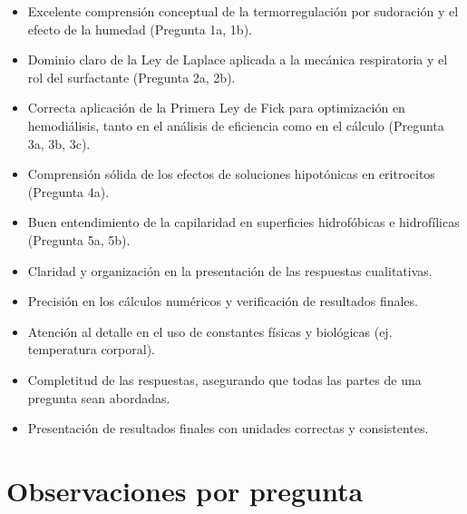 \documentclass[11pt,a4paper]{article}
\begin{document}
\vspace{4pt}
\begin{minipage}[t]{0.48\linewidth}
  \begin{tcolorbox}[cajaFortaleza, title={Fortalezas}]
\begin{itemize}[leftmargin=1.5em, itemsep=2pt]
  \item Excelente comprensión conceptual de la termorregulación por sudoración y el efecto de la humedad (Pregunta 1a, 1b).
  \item Dominio claro de la Ley de Laplace aplicada a la mecánica respiratoria y el rol del surfactante (Pregunta 2a, 2b).
  \item Correcta aplicación de la Primera Ley de Fick para optimización en hemodiálisis, tanto en el análisis de eficiencia como en el cálculo (Pregunta 3a, 3b, 3c).
  \item Comprensión sólida de los efectos de soluciones hipotónicas en eritrocitos (Pregunta 4a).
  \item Buen entendimiento de la capilaridad en superficies hidrofóbicas e hidrofílicas (Pregunta 5a, 5b).
  \item Claridad y organización en la presentación de las respuestas cualitativas.
\end{itemize}
  \end{tcolorbox}
\end{minipage}
\hfill
\begin{minipage}[t]{0.48\linewidth}
  \begin{tcolorbox}[cajaMejora, title={Areas de mejora}]
\begin{itemize}[leftmargin=1.5em, itemsep=2pt]
  \item Precisión en los cálculos numéricos y verificación de resultados finales.
  \item Atención al detalle en el uso de constantes físicas y biológicas (ej. temperatura corporal).
  \item Completitud de las respuestas, asegurando que todas las partes de una pregunta sean abordadas.
  \item Presentación de resultados finales con unidades correctas y consistentes.
\end{itemize}
  \end{tcolorbox}
\end{minipage}

\section*{Observaciones por pregunta}
\end{document}
